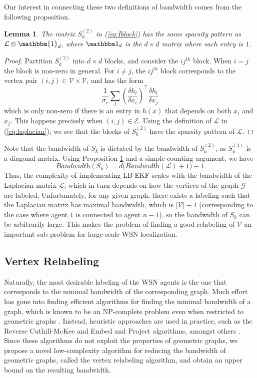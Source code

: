 \documentclass[twocolumn]{article}
\theoremstyle{plain}
\newtheorem{lemma}{Lemma}
\theoremstyle{definition}
\theoremstyle{definition}
\theoremstyle{remark}
\begin{document}
Our interest in connecting these two definitions of bandwidth comes from the following proposition.
\begin{lemma}
The matrix $S^{(2)}_{k}$ in (\ref{eq:Iblock}) has the same sparsity pattern as $\mathcal L\otimes \mathbbm{1}_d$, where $\mathbbm 1_d$ is the $d \times d$ matrix where each entry is $1$.
\label{prop:sparsity}
\end{lemma}
\begin{proof}
Partition $S^{(2)}_{k}$ into $d \times d$ blocks, and consider the $ij^{th}$ block. When $i=j$ the block is non-zero in general. For $i\neq j$, the $ij^{th}$ block corresponds to the vertex pair $(i,j)\in\mathcal V \times \mathcal V $, and has the form 
\begin{equation*}
\frac{1}{\sigma_r}\sum_{l}\left(\frac{\delta h_l}{\delta x_i}\right)^\top\frac{\delta h_l}{\delta x_j}
\end{equation*}
which is only non-zero if there is an entry in $h(x)$ that depends on both $x_i$ and $x_j$. This happens precisely when $(i,j)\in \mathcal E$. Using the definition of $\mathcal L$ in (\ref{eq:laplacian}), we see that the blocks of $S^{(2)}_{k}$ have the sparsity pattern of $\mathcal L$.
\end{proof}
\noindent
Note that the bandwidth of $S_k$ is dictated by the bandwidth of $S^{(2)}_k$, as $S^{(1)}_k$ is a diagonal matrix. Using Proposition \ref{prop:sparsity} and a simple counting argument, we have
\begin{equation}
\textit{Bandwidth}(S_{k}) = d\big(\textit{Bandwidth}(\mathcal L)+1\big)-1
\end{equation}
Thus, the complexity of implementing LB-EKF scales with the bandwidth of the Laplacian matrix $\mathcal L$, which in turn depends on how the vertices of the graph $\mathcal G$ are labeled. Unfortunately, for any given graph, there exists a labeling such that the Laplacian matrix has maximal bandwidth, which is $|\mathcal V|-1$ (corresponding to the case where agent $1$ is connected to agent $n-1$), so the bandwidth of $S_{k}$ can be arbitrarily large. This makes the problem of finding a good relabeling of $\mathcal V$ an important sub-problem for large-scale WSN localization.
\subsection{Vertex Relabeling}
\label{sec:vr_gg}
Naturally, the most desirable labeling of the WSN agents is the one that corresponds to the minimal bandwidth of the corresponding graph. Much effort has gone into finding efficient algorithms for finding the minimal bandwidth of a graph, which is known to be an NP-complete problem even when restricted to geometric graphs \cite[Theorem 3.1]{bandwidth_NPcompleteness2001Penrose}. 
Instead, heuristic approaches are used in practice, such as the Reverse Cuthill-McKee \cite{rcm2017} and Embed and Project \cite{embedAndProject} algorithms, amongst others \cite{bandwidthsSurvey2014}. Since these algorithms do not exploit the properties of geometric graphs, we propose a novel low-complexity algorithm for reducing the bandwidth of geometric graphs, called the vertex relabeling algorithm, and obtain an upper bound on the resulting bandwidth. 
\end{document}
